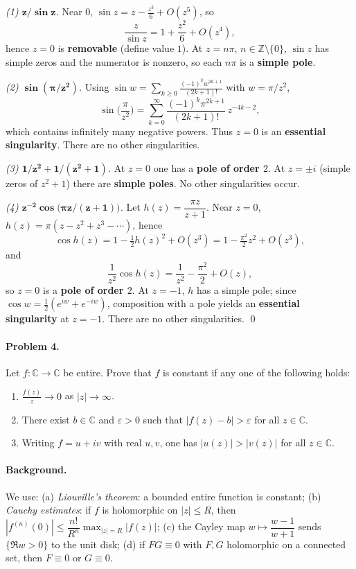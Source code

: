 \documentclass[11pt,a4paper]{article}
\theoremstyle{definition}
\theoremstyle{definition}
\theoremstyle{plain}
\theoremstyle{remark}
\begin{document}
\medskip
\emph{(1) $\boldsymbol{z/\sin z}$.}
Near $0$, $\sin z=z-\frac{z^{3}}{6}+O(z^{5})$, so
\[
\frac{z}{\sin z}=1+\frac{z^{2}}{6}+O(z^{4}),
\]
hence $z=0$ is \textbf{removable} (define value $1$). At $z=n\pi$, $n\in\mathbb Z\setminus\{0\}$,
$\sin z$ has simple zeros and the numerator is nonzero, so each $n\pi$ is a \textbf{simple pole}.

\medskip
\emph{(2) $\boldsymbol{\sin(\pi/z^{2})}$.}
Using $\sin w=\sum_{k\ge0}\frac{(-1)^k w^{2k+1}}{(2k+1)!}$ with $w=\pi/z^{2}$,
\[
\sin\!\Big(\frac{\pi}{z^{2}}\Big)=\sum_{k=0}^{\infty}\frac{(-1)^k \pi^{2k+1}}{(2k+1)!}\,z^{-4k-2},
\]
which contains infinitely many negative powers. Thus $z=0$ is an \textbf{essential singularity}.
There are no other singularities.

\medskip
\emph{(3) $\boldsymbol{1/z^{2} + 1/(z^{2}+1)}$.}
At $z=0$ one has a \textbf{pole of order $2$}. At $z=\pm i$ (simple zeros of $z^{2}+1$) there are
\textbf{simple poles}. No other singularities occur.

\medskip
\emph{(4) $\boldsymbol{z^{-2}\cos\!\big(\pi z/(z+1)\big)}$.}
Let $h(z)=\dfrac{\pi z}{z+1}$.
Near $z=0$, $h(z)=\pi(z-z^{2}+z^{3}-\cdots)$, hence
\[
\cos h(z)=1-\tfrac12 h(z)^{2}+O(z^{3})=1-\tfrac{\pi^{2}}{2}z^{2}+O(z^{3}),
\]
and
\[
\frac{1}{z^{2}}\cos h(z)=\frac{1}{z^{2}}-\frac{\pi^{2}}{2}+O(z),
\]
so $z=0$ is a \textbf{pole of order $2$}. At $z=-1$, $h$ has a simple pole; since
$\cos w=\tfrac12(e^{iw}+e^{-iw})$, composition with a pole yields an \textbf{essential singularity}
at $z=-1$. There are no other singularities.
\qed

\paragraph{Problem 4.}
Let $f:\mathbb C\to\mathbb C$ be entire. Prove that $f$ is constant if any one of the following holds:
\begin{enumerate}[label=(\roman*)]
	\item $\displaystyle \frac{f(z)}{z}\to 0$ as $|z|\to\infty$.
	\item There exist $b\in\mathbb C$ and $\varepsilon>0$ such that $|f(z)-b|>\varepsilon$ for all $z\in\mathbb C$.
	\item Writing $f=u+iv$ with real $u,v$, one has $|u(z)|>|v(z)|$ for all $z\in\mathbb C$.
\end{enumerate}

\paragraph{Background.}
We use: (a) \emph{Liouville’s theorem}: a bounded entire function is constant; (b) \emph{Cauchy estimates}:
if $f$ is holomorphic on $|z|\le R$, then $|f^{(n)}(0)|\le \dfrac{n!}{R^n}\max_{|z|=R}|f(z)|$; 
(c) the Cayley map $w\mapsto \dfrac{w-1}{w+1}$ sends $\{\Re w>0\}$ to the unit disk; 
(d) if $FG\equiv 0$ with $F,G$ holomorphic on a connected set, then $F\equiv 0$ or $G\equiv 0$.
\end{document}
